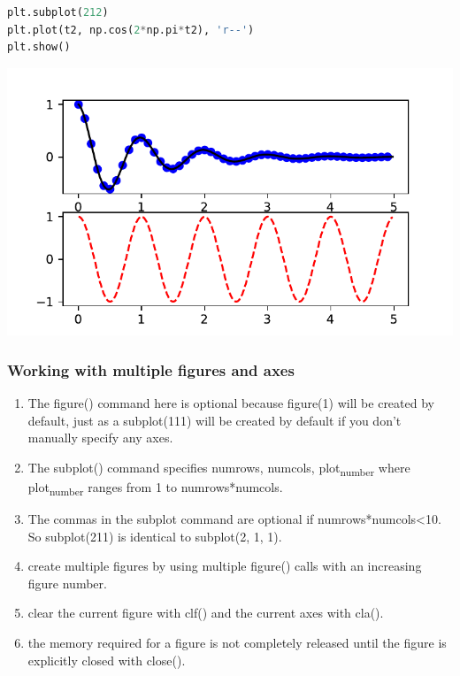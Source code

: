 \documentclass[UTF8,a4paper,12pt]{ctexart}  %
\providecommand{\tightlist}{\setlength{\itemsep}{0pt}\setlength{\parskip}{0pt}}
\begin{document}
\begin{lstlisting}[language=Python]
plt.subplot(212)
plt.plot(t2, np.cos(2*np.pi*t2), 'r--')
plt.show()
\end{lstlisting}

\begin{center}\includegraphics[width=0.9\linewidth]{python-visualization_files/figure-latex/unnamed-chunk-14-1} \end{center}

\hypertarget{working-with-multiple-figures-and-axes-1}{%
\subsubsection{Working with multiple figures and axes}\label{working-with-multiple-figures-and-axes-1}}

\begin{enumerate}
\def\labelenumi{\arabic{enumi}.}
\tightlist
\item
  The figure() command here is optional because figure(1) will be
  created by default, just as a subplot(111) will be created by
  default if you don't manually specify any axes.
\item
  The subplot() command specifies numrows, numcols, plot\textsubscript{number} where
  plot\textsubscript{number} ranges from 1 to numrows*numcols.
\item
  The commas in the subplot command are optional if
  numrows*numcols\textless{}10. So subplot(211) is identical to subplot(2, 1,
  1).
\item
  create multiple figures by using multiple figure() calls with an
  increasing figure number.
\item
  clear the current figure with clf() and the current axes with cla().
\item
  the memory required for a figure is not completely released until
  the figure is explicitly closed with close().
\end{enumerate}
\end{document}
